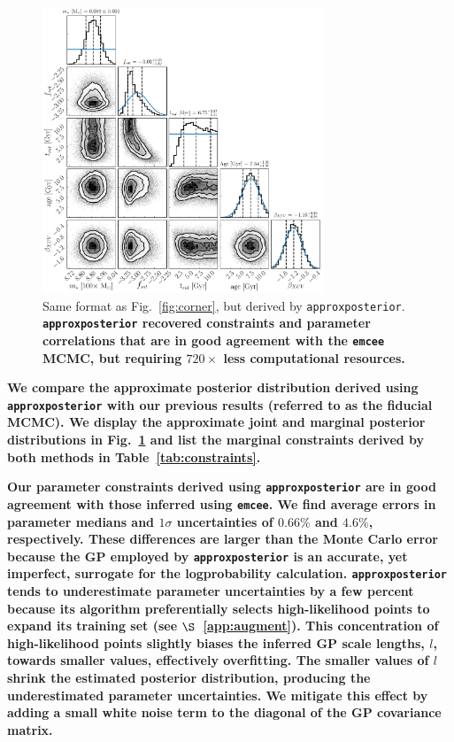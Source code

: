 \documentclass[twocolumn]{aastex62}
\newcommand{\xxx}[1]{{\textbf{#1}}}
\newcommand{\emcee}[0]{\texttt{emcee}\xspace}
\newcommand{\approxposterior}[0]{\texttt{approxposterior}\xspace}
\begin{document}
\begin{figure}
\centering
	\includegraphics[width=0.75\textwidth]{../Analysis/Approx/apCorner.pdf}
   \caption{Same format as Fig.~\ref{fig:corner}, but derived by \approxposterior. \xxx{\approxposterior recovered constraints and parameter correlations that are in good agreement with the \emcee MCMC, but requiring $720\times$ less computational resources.}}%
    \label{fig:approx}%
\end{figure}

\xxx{We compare the approximate posterior distribution derived using \approxposterior with our previous results (referred to as the fiducial MCMC). We display the approximate joint and \xxx{marginal} posterior distributions in Fig.~\ref{fig:approx} and list the \xxx{marginal} constraints derived by both methods in Table~\ref{tab:constraints}.}

\xxx{Our parameter constraints derived using \approxposterior are in good agreement with those inferred using \emcee. We find average errors in parameter medians and $1\sigma$ uncertainties of $0.66\%$ and $4.6\%$, respectively. These differences are larger than the Monte Carlo error because the GP employed by \approxposterior is an accurate, yet imperfect, surrogate for the logprobability calculation. \approxposterior tends to underestimate parameter uncertainties by a few percent because its algorithm preferentially selects high-likelihood points to expand its training set (see $\S$~\ref{app:augment}). This concentration of high-likelihood points slightly biases the inferred GP scale lengths, $l$, towards smaller values, effectively overfitting. The smaller values of $l$ shrink the estimated posterior distribution, producing the underestimated parameter uncertainties. We mitigate this effect by adding a small white noise term to the diagonal of the GP covariance matrix.}
\end{document}
